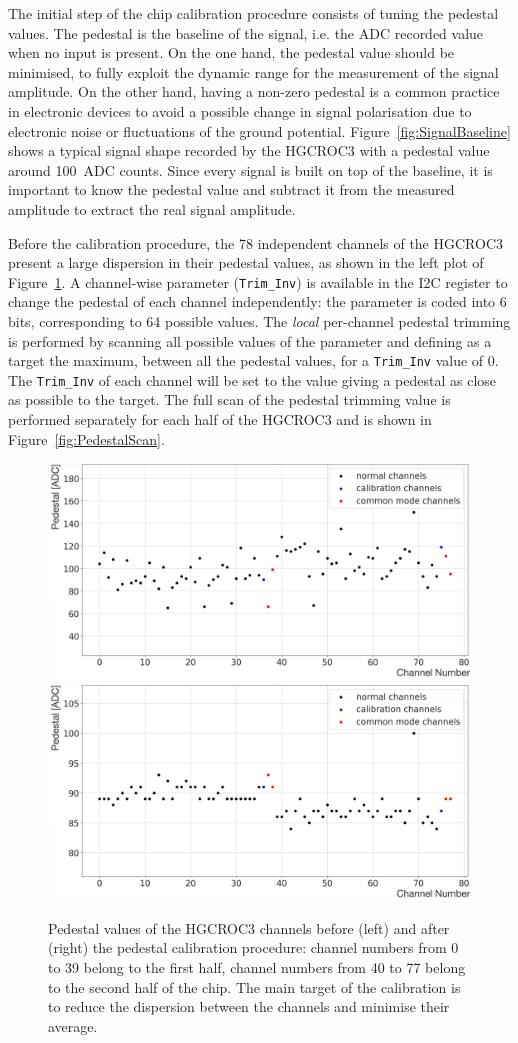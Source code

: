 The initial step of the chip calibration procedure consists of tuning the pedestal values. The pedestal is the baseline of the signal, i.e. the ADC recorded value when no input is present. On the one hand, the pedestal value should be minimised, to fully exploit the dynamic range for the measurement of the signal amplitude. On the other hand, having a non-zero pedestal is a common practice in electronic devices to avoid a possible change in signal polarisation due to electronic noise or fluctuations of the ground potential.
Figure~\ref{fig:SignalBaseline} shows a typical signal shape recorded by the HGCROC3 with a pedestal value around 100~ADC counts. Since every signal is built on top of the baseline, it is important to know the pedestal value and subtract it from the measured amplitude to extract the real signal amplitude.

Before the calibration procedure, the 78 independent channels of the HGCROC3 present a large dispersion in their pedestal values, as shown in the left plot of Figure~\ref{fig:Pedestal}. 
A channel-wise parameter (\texttt{Trim\_Inv}) is available in the I2C register to change the pedestal of each channel independently: the parameter is coded into 6 bits, corresponding to 64 possible values.
The \textit{local} per-channel pedestal trimming is performed by scanning all possible values of the parameter and defining as a target the maximum, between all the pedestal values, for a \texttt{Trim\_Inv} value of 0. The \texttt{Trim\_Inv} of each channel will be set to the value giving a pedestal as close as possible to the target.
The full scan of the pedestal trimming value is performed separately for each half of the HGCROC3 and is shown in Figure~\ref{fig:PedestalScan}.

\begin{figure}
    \centering
    \includegraphics[width=0.49\linewidth]{Figures/HGCAL/Pedestal_0.pdf}
    \includegraphics[width=0.49\linewidth]{Figures/HGCAL/Pedestal_1.pdf}
    \caption{Pedestal values of the HGCROC3 channels before (left) and after (right) the pedestal calibration procedure: channel numbers from 0 to 39 belong to the first half, channel numbers from 40 to 77 belong to the second half of the chip. The main target of the calibration is to reduce the dispersion between the channels and minimise their average.}
    \label{fig:Pedestal}
\end{figure}

